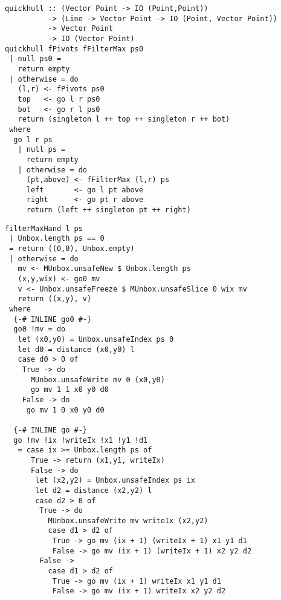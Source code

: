 \begin{lstlisting}[float=ht,label=l:a:bench:quickhull,caption=Quickhull skeleton parameterised by filterMax and pivots]
quickhull :: (Vector Point -> IO (Point,Point))
          -> (Line -> Vector Point -> IO (Point, Vector Point))
          -> Vector Point
          -> IO (Vector Point)
quickhull fPivots fFilterMax ps0
 | null ps0 =
   return empty
 | otherwise = do
   (l,r) <- fPivots ps0
   top   <- go l r ps0
   bot   <- go r l ps0
   return (singleton l ++ top ++ singleton r ++ bot)
 where
  go l r ps
   | null ps =
     return empty
   | otherwise = do
     (pt,above) <- fFilterMax (l,r) ps
     left       <- go l pt above
     right      <- go pt r above
     return (left ++ singleton pt ++ right)
\end{lstlisting}


\begin{lstlisting}[float=ht,label=l:a:bench:filterMaxHand,caption=Hand-fused implementation of \Hs/filterMax/]
filterMaxHand l ps
 | Unbox.length ps == 0
 = return ((0,0), Unbox.empty)
 | otherwise = do
   mv <- MUnbox.unsafeNew $ Unbox.length ps
   (x,y,wix) <- go0 mv
   v <- Unbox.unsafeFreeze $ MUnbox.unsafeSlice 0 wix mv
   return ((x,y), v)
 where
  {-# INLINE go0 #-}
  go0 !mv = do
   let (x0,y0) = Unbox.unsafeIndex ps 0
   let d0 = distance (x0,y0) l
   case d0 > 0 of
    True -> do
      MUnbox.unsafeWrite mv 0 (x0,y0)
      go mv 1 1 x0 y0 d0
    False -> do
     go mv 1 0 x0 y0 d0

  {-# INLINE go #-}
  go !mv !ix !writeIx !x1 !y1 !d1
   = case ix >= Unbox.length ps of
      True -> return (x1,y1, writeIx)
      False -> do
       let (x2,y2) = Unbox.unsafeIndex ps ix
       let d2 = distance (x2,y2) l
       case d2 > 0 of
        True -> do
          MUnbox.unsafeWrite mv writeIx (x2,y2)
          case d1 > d2 of
           True -> go mv (ix + 1) (writeIx + 1) x1 y1 d1
           False -> go mv (ix + 1) (writeIx + 1) x2 y2 d2
        False ->
          case d1 > d2 of
           True -> go mv (ix + 1) writeIx x1 y1 d1
           False -> go mv (ix + 1) writeIx x2 y2 d2
\end{lstlisting}

